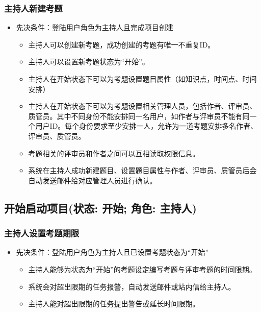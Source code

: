\documentclass[hyperref, a4paper]{ctexart}
\providecommand{\tightlist}{%
  \setlength{\itemsep}{0pt}\setlength{\parskip}{0pt}}
\begin{document}
\hypertarget{ux4e3bux6301ux4ebaux65b0ux5efaux8003ux9898}{%
\subsubsection{主持人新建考题}\label{ux4e3bux6301ux4ebaux65b0ux5efaux8003ux9898}}

\begin{itemize}
\tightlist
\item
  先决条件：登陆用户角色为主持人且完成项目创建

  \begin{itemize}
  \tightlist
  \item
    主持人可以创建新考题，成功创建的考题有唯一不重复ID。
  \item
    主持人可以设置新考题状态为``开始''。
  \item
    主持人在开始状态下可以为考题设置题目属性（如知识点，时间点、时间安排）
  \item
    主持人在开始状态下可以为考题设置相关管理人员，包括作者、评审员、质管员。其中不同身份不能安排同一名用户，如作者与评审员不能有同一个用户ID。每个身份要求至少安排一人，允许为一道考题安排多名作者、评审员、质管员。
  \item
    考题相关的评审员和作者之间可以互相读取权限信息。
  \item
    系统在主持人成功新建题目、设置题目属性与作者、评审员、质管员后会自动发送邮件给对应管理人员进行确认。
  \end{itemize}
\end{itemize}

\hypertarget{ux5f00ux59cbux542fux52a8ux9879ux76eeux72b6ux6001-ux5f00ux59cb-ux89d2ux8272-ux4e3bux6301ux4eba}{%
\subsection{开始启动项目(状态: 开始; 角色:
主持人)}\label{ux5f00ux59cbux542fux52a8ux9879ux76eeux72b6ux6001-ux5f00ux59cb-ux89d2ux8272-ux4e3bux6301ux4eba}}

\hypertarget{ux4e3bux6301ux4ebaux8bbeux7f6eux8003ux9898ux671fux9650}{%
\subsubsection{主持人设置考题期限}\label{ux4e3bux6301ux4ebaux8bbeux7f6eux8003ux9898ux671fux9650}}

\begin{itemize}
\tightlist
\item
  先决条件：登陆用户角色为主持人且已设置考题状态为``开始''

  \begin{itemize}
  \tightlist
  \item
    主持人能够为状态为``开始''的考题设定编写考题与评审考题的时间限期。
  \item
    系统会对超出限期的任务报警，自动发送邮件或站内信给主持人。
  \item
    主持人能对超出限期的任务提出警告或延长时间限期。
  \end{itemize}
\end{itemize}
\end{document}
